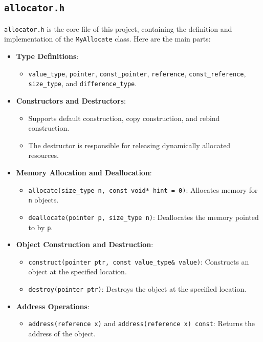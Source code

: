 \documentclass[a4paper]{article}
\begin{document}
  \subsection{\texttt{allocator.h}}
  
  \texttt{allocator.h} is the core file of this project, containing the definition and implementation of the \texttt{MyAllocate} class. Here are the main parts:
  
  \begin{itemize}
      \item \textbf{Type Definitions}:
      \begin{itemize}
          \item \texttt{value\_type}, \texttt{pointer}, \texttt{const\_pointer}, \texttt{reference}, \texttt{const\_reference}, \texttt{size\_type}, and \texttt{difference\_type}.
      \end{itemize}
      \item \textbf{Constructors and Destructors}:
      \begin{itemize}
          \item Supports default construction, copy construction, and rebind construction.
          \item The destructor is responsible for releasing dynamically allocated resources.
      \end{itemize}
      \item \textbf{Memory Allocation and Deallocation}:
      \begin{itemize}
          \item \texttt{allocate(size\_type n, const void* hint = 0)}: Allocates memory for \texttt{n} objects.
          \item \texttt{deallocate(pointer p, size\_type n)}: Deallocates the memory pointed to by \texttt{p}.
      \end{itemize}
      \item \textbf{Object Construction and Destruction}:
      \begin{itemize}
          \item \texttt{construct(pointer ptr, const value\_type\& value)}: Constructs an object at the specified location.
          \item \texttt{destroy(pointer ptr)}: Destroys the object at the specified location.
      \end{itemize}
      \item \textbf{Address Operations}:
      \begin{itemize}
          \item \texttt{address(reference x)} and \texttt{address(reference x) const}: Returns the address of the object.

\end{itemize}
\end{itemize}
\end{document}
